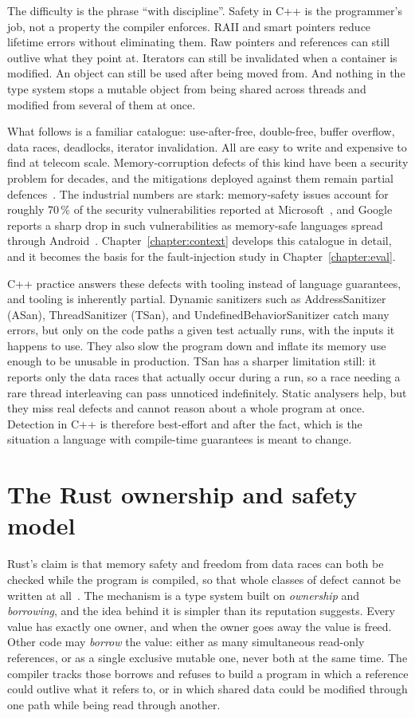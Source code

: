 \documentclass[english,twoside,openright,a4paper,censored,csm,software-track-2020]{HYthesisML}
\begin{document}
The difficulty is the phrase ``with discipline''. Safety in C++ is the programmer's job, not a
property the compiler enforces. RAII and smart pointers reduce lifetime errors without
eliminating them. Raw pointers and references can still outlive what they point at. Iterators
can still be invalidated when a container is modified. An object can still be used after being
moved from. And nothing in the type system stops a mutable object from being shared across
threads and modified from several of them at once.

What follows is a familiar catalogue: use-after-free, double-free, buffer overflow, data races,
deadlocks, iterator invalidation. All are easy to write and expensive to find at telecom scale.
Memory-corruption defects of this kind have been a security problem for decades, and the
mitigations deployed against them remain partial defences~\cite{szekeres2013sok}. The industrial
numbers are stark: memory-safety issues account for roughly 70\,\% of the security
vulnerabilities reported at Microsoft~\cite{msrc2019memory}, and Google reports a sharp drop in
such vulnerabilities as memory-safe languages spread through
Android~\cite{google2022android}. Chapter~\ref{chapter:context} develops this catalogue in
detail, and it becomes the basis for the fault-injection study in Chapter~\ref{chapter:eval}.

C++ practice answers these defects with tooling instead of language guarantees, and tooling is
inherently partial. Dynamic sanitizers such as AddressSanitizer (ASan), ThreadSanitizer (TSan),
and UndefinedBehaviorSanitizer catch many errors, but only on the code paths a given test
actually runs, with the inputs it happens to use. They also slow the program down and inflate
its memory use enough to be unusable in production. TSan has a sharper limitation still: it
reports only the data races that actually occur during a run, so a race needing a rare thread
interleaving can pass unnoticed indefinitely. Static analysers help, but they miss real defects
and cannot reason about a whole program at once. Detection in C++ is therefore best-effort and
after the fact, which is the situation a language with compile-time guarantees is meant to
change.

\section{The Rust ownership and safety model}
Rust's claim is that memory safety and freedom from data races can both be checked while the
program is compiled, so that whole classes of defect cannot be written at
all~\cite{klabnik2023rust}. The mechanism is a type system built on \emph{ownership} and
\emph{borrowing}, and the idea behind it is simpler than its reputation suggests. Every value
has exactly one owner, and when the owner goes away the value is freed. Other code may
\emph{borrow} the value: either as many simultaneous read-only references, or as a single
exclusive mutable one, never both at the same time. The compiler tracks those borrows and
refuses to build a program in which a reference could outlive what it refers to, or in which
shared data could be modified through one path while being read through another.
\end{document}
